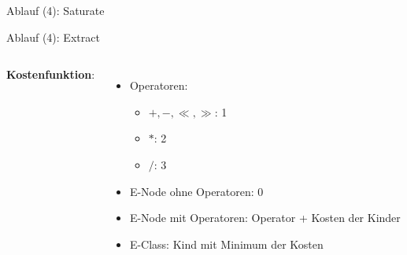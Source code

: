 \begin{frame}{Ablauf (4): Saturate}
\end{frame}

\begin{frame}{Ablauf (4): Extract}
    \begin{columns}[c]
            \textbf{Kostenfunktion}:
            \begin{itemize}
                \item Operatoren: \begin{itemize}
                    \item $+, -, \ll, \gg$: \colorbox{blue-300}{1}
                    \item $*$: \colorbox{blue-300}{2}
                    \item $/$: \colorbox{blue-300}{3}
                \end{itemize}
                \item E-Node ohne Operatoren: \colorbox{blue-300}{0}
                \item E-Node mit Operatoren: \colorbox{blue-300}{Operator + Kosten der Kinder}
                \item E-Class: \colorbox{blue-300}{Kind mit Minimum der Kosten}
            \end{itemize}
            
    \end{columns}
\end{frame}